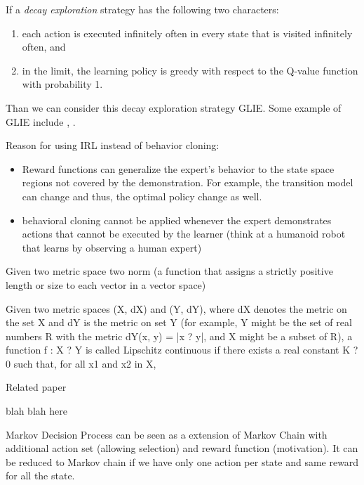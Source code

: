 \documentclass[9pt]{article}
\begin{document}
If a \textit{decay exploration} strategy has the following two characters:
\begin{enumerate}
\item each action is executed infinitely often in every state that is visited infinitely often, and
\item in the limit, the learning policy is greedy with respect to the Q-value function with probability 1.
\end{enumerate}
Than we can consider this decay exploration strategy GLIE. Some example of GLIE include , .

Reason for using IRL instead of behavior cloning:
\begin{itemize}
\item Reward functions can generalize the expert's behavior to the state space regions not covered by the demonstration. For example, the transition model can change and thus, the optimal policy change as well. 
\item behavioral cloning cannot be applied whenever the expert demonstrates actions that cannot be executed by the
learner (think at a humanoid robot that learns by observing a human expert)
\end{itemize}

  Given two metric space two norm (a function that assigns  a strictly positive length or size to each vector in a vector space)

Given two metric spaces (X, dX) and (Y, dY), where dX denotes the metric on the set X and dY is the metric on set Y (for example, Y might be the set of real numbers R with the metric dY(x, y) = |x ? y|, and X might be a subset of R), a function f : X ? Y is called Lipschitz continuous if there exists a real constant K ? 0 such that, for all x1 and x2 in X,

\citep{Eriksson2013Applied}

 \Working

Related paper


blah blah here

Markov Decision Process can be seen as a extension of Markov Chain with additional action set (allowing selection) and reward function (motivation). It can be reduced to Markov chain if we have only one action per state and same reward for all the state.
\end{document}
